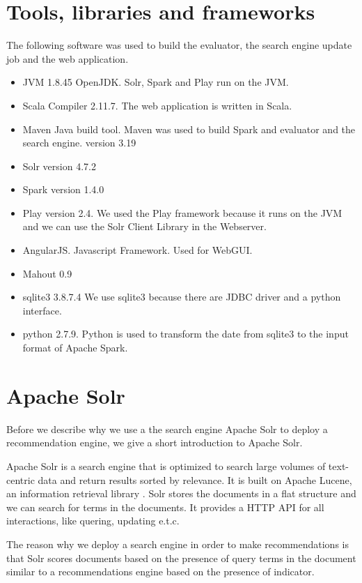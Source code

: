 \section{Tools, libraries and frameworks}

The following software was used to build the evaluator, the search engine update job and the web application.
\begin{itemize}
\item JVM 1.8.45 OpenJDK. Solr, Spark and Play run on the JVM.
\item Scala Compiler 2.11.7. The web application is written in Scala.
\item Maven Java build tool. Maven was used to build Spark and evaluator and the search engine. version 3.19
\item Solr version 4.7.2
\item Spark version 1.4.0
\item Play version 2.4. We used the Play framework because it runs on the JVM and we can use the Solr Client Library in the Webserver.
\item AngularJS. Javascript Framework. Used for WebGUI.
\item Mahout 0.9 
\item sqlite3 3.8.7.4 We use sqlite3 because there are JDBC driver and a python interface.
\item python 2.7.9. Python is used to transform the date from sqlite3 to the input format of Apache Spark.
\end{itemize}

\section{Apache Solr}
\label{sec:solr}

Before we describe why we use a the search engine Apache Solr to deploy a recommendation engine, we give a short introduction to Apache Solr.

Apache Solr is a search engine that is optimized to search large volumes of text-centric data and return results sorted by relevance. It is built on Apache Lucene, an information retrieval library \cite{grainger}. Solr stores the documents in a flat structure and we can search for terms in the documents. It provides a HTTP API for all interactions, like quering, updating e.t.c.

The reason why we deploy a search engine in order to make recommendations is that Solr scores documents based on the presence of query terms in the document similar to a recommendations engine based on the presence of indicator.

